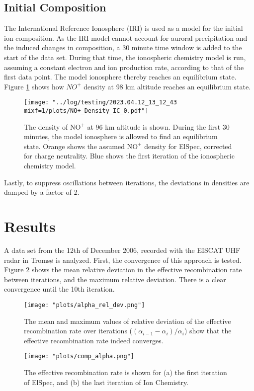 \documentclass[10pt, a4paper]{article}
\numberwithin{equation}{section}										%
\begin{document}
\subsection{Initial Composition}
The International Reference Ionosphere (IRI) \cite{bilitza_international_2014} is used as a model for the initial ion composition. As the IRI model cannot account for auroral precipitation and the induced changes in composition, a 30 minute time window is added to the start of the data set. During that time, the ionospheric chemistry model is run, assuming a constant electron and ion production rate, according to that of the first data point. The model ionosphere thereby reaches an equilibrium state. Figure \ref{fig:dialin} shows how $NO^+$ density at 98 km altitude reaches an equilibrium state.


\begin{figure}
	\centering
	\texttt{[image: "../log/testing/2023.04.12\_13\_12\_43 mixf=1/plots/NO+\_Density\_IC\_0.pdf"]}
	\caption{The density of $\mathrm{NO^+}$ at 96 km altitude is shown. During the first 30 minutes, the model ionosphere is allowed to find an equilibrium state. Orange shows the assumed $\mathrm{NO^+}$ density for ElSpec, corrected for charge neutrality. Blue shows the first iteration of the ionospheric chemistry model.}
	\label{fig:dialin}
\end{figure}
%

Lastly, to suppress oscillations between iterations, the deviations in densities are damped by a factor of 2.


\section{Results}
A data set from the 12th of December 2006, recorded with the EISCAT UHF radar in Tromsø is analyzed. First, the convergence of this approach is tested. Figure \ref{fig:convergence} shows the mean relative deviation in the effective recombination rate between iterations, and the maximum relative deviation. There is a clear convergence until the 10th iteration. 

\begin{figure}
	\centering
	\texttt{[image: "plots/alpha\_rel\_dev.png"]}
	\caption{The mean and maximum values of relative deviation of the effective recombination rate over iterations ($(\alpha_{i-1} - \alpha_{i})/\alpha_{i} $) show that the effective recombination rate indeed converges.}
	\label{fig:convergence}
\end{figure}
%
\par\medskip
%
\begin{figure}
	\centering
	\texttt{[image: "plots/comp\_alpha.png"]}
	\caption{The effective recombination rate is shown for (a) the first iteration of ElSpec, and (b) the last iteration of Ion Chemistry.}
	\label{fig:alpha}
\end{figure}
\end{document}
